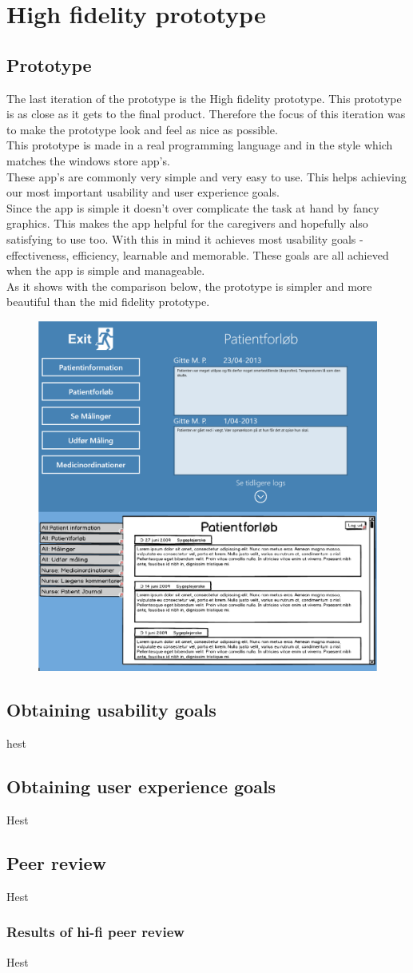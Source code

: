 \chapter{High fidelity prototype}


\section{Prototype}
The last iteration of the prototype is the High fidelity prototype. This prototype is as close as it gets to the final product. Therefore the focus of this iteration was to make the prototype look and feel as nice as possible.\\
This prototype is made in a real programming language and in the style which matches the windows store app's.\\
These app's are commonly very simple and very easy to use. This helps achieving our most important usability and user experience goals.\\
Since the app is simple it doesn't over complicate the task at hand by fancy graphics. This makes the app helpful for the caregivers and hopefully also satisfying to use too. With this in mind it achieves most usability goals - effectiveness, efficiency, learnable and memorable. These goals are all achieved when the app is simple and manageable.\\
As it shows with the comparison below, the prototype is simpler and more beautiful than the mid fidelity prototype.\\
\begin{figure}[H]
\centering
\includegraphics[width=.7\textwidth]{billeder/midhigh_compare.png}
\end{figure}

\section{Obtaining usability goals}
hest

\section{Obtaining user experience goals}
Hest

\section{Peer review}
Hest

\subsection{Results of hi-fi peer review}
Hest